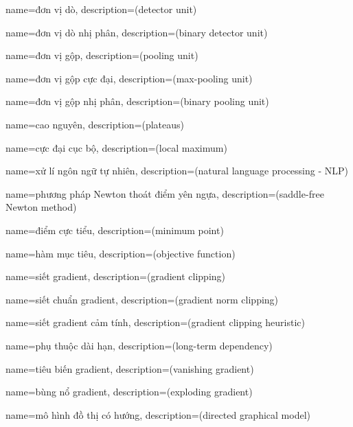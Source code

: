 {
    name={đơn vị dò},
    description={(detector unit)}
}

{
    name={đơn vị dò nhị phân},
    description={(binary detector unit)}
}

{
    name={đơn vị gộp},
    description={(pooling unit)}
}

{
    name={đơn vị gộp cực đại},
    description={(max-pooling unit)}
}

{
    name={đơn vị gộp nhị phân},
    description={(binary pooling unit)}
}

{
    name={cao nguyên},
    description={(plateaus)}
}

{
    name={cực đại cục bộ},
    description={(local maximum)}
}

{
    name={xử lí ngôn ngữ tự nhiên},
    description={(natural language processing - NLP)}
}

{
    name={phương pháp Newton thoát điểm yên ngựa},
    description={(saddle-free Newton method)}
}

{
    name={điểm cực tiểu},
    description={(minimum point)}
}

{
    name={hàm mục tiêu},
    description={(objective function)}
}

{
    name={siết gradient},
    description={(gradient clipping)}
}

{
    name={siết chuẩn gradient},
    description={(gradient norm clipping)}
}

{
    name={siết gradient cảm tính},
    description={(gradient clipping heuristic)}
}

{
    name={phụ thuộc dài hạn},
    description={(long-term dependency)}
}

{
    name={tiêu biến gradient},
    description={(vanishing gradient)}
}

{
    name={bùng nổ gradient},
    description={(exploding gradient)}
}

{
    name={mô hình đồ thị có hướng},
    description={(directed graphical model)}
}

